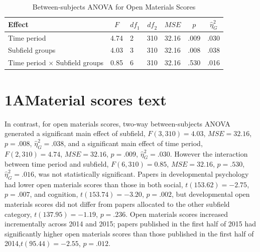 \documentclass[
  english,
  man]{apa6}
\begin{document}
\begin{table}[tbp]

\begin{center}
\begin{threeparttable}

\caption{\label{tab:1A-m-anova}Between-subjects ANOVA for Open Materials Scores}

\begin{tabular}{lllllll}
\toprule
Effect & \multicolumn{1}{c}{$F$} & \multicolumn{1}{c}{$\mathit{df}_1$} & \multicolumn{1}{c}{$\mathit{df}_2$} & \multicolumn{1}{c}{$\mathit{MSE}$} & \multicolumn{1}{c}{$p$} & \multicolumn{1}{c}{$\hat{\eta}^2_G$}\\
\midrule
Time period & 4.74 & 2 & 310 & 32.16 & .009 & .030\\
Subfield groups & 4.03 & 3 & 310 & 32.16 & .008 & .038\\
Time period $\times$ Subfield groups & 0.85 & 6 & 310 & 32.16 & .530 & .016\\
\bottomrule
\end{tabular}

\end{threeparttable}
\end{center}

\end{table}

\hypertarget{amaterial-scores-text}{%
\section{1AMaterial scores text}\label{amaterial-scores-text}}

In contrast, for open materials scores, two-way between-subjects ANOVA generated a significant main effect of subfield, \(F(3, 310) = 4.03\), \(\mathit{MSE} = 32.16\), \(p = .008\), \(\hat{\eta}^2_G = .038\), and a significant main effect of time period, \(F(2, 310) = 4.74\), \(\mathit{MSE} = 32.16\), \(p = .009\), \(\hat{\eta}^2_G = .030\). However the interaction between time period and subfield, \(F(6, 310) = 0.85\), \(\mathit{MSE} = 32.16\), \(p = .530\), \(\hat{\eta}^2_G = .016\), was not statistically significant. Papers in developmental psychology had lower open materials scores than those in both social, \(t(153.62) = -2.75\), \(p = .007\), and cognition, \(t(153.74) = -3.20\), \(p = .002\), but developmental open materials scores did not differ from papers allocated to the other subfield category, \(t(137.95) = -1.19\), \(p = .236\). Open materials scores increased incrementally across 2014 and 2015; papers published in the first half of 2015 had significantly higher open materials scores than those published in the first half of 2014,\(t(95.44) = -2.55\), \(p = .012\).
\end{document}
